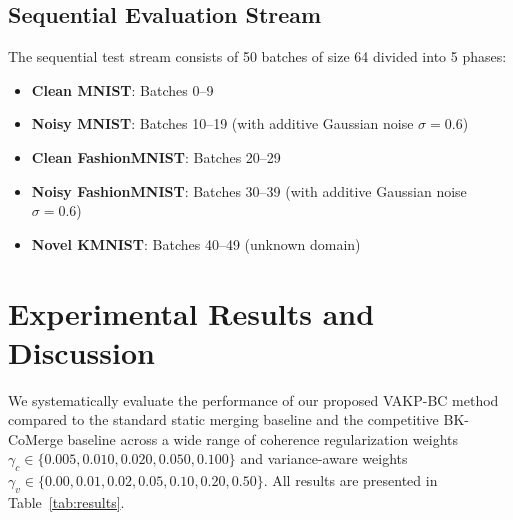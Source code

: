 \documentclass{article}
\theoremstyle{plain}
\theoremstyle{definition}
\theoremstyle{remark}
\begin{document}
\subsection{Sequential Evaluation Stream}
The sequential test stream consists of 50 batches of size 64 divided into 5 phases:
\begin{itemize}
    \item \textbf{Clean MNIST}: Batches 0--9
    \item \textbf{Noisy MNIST}: Batches 10--19 (with additive Gaussian noise $\sigma = 0.6$)
    \item \textbf{Clean FashionMNIST}: Batches 20--29
    \item \textbf{Noisy FashionMNIST}: Batches 30--39 (with additive Gaussian noise $\sigma = 0.6$)
    \item \textbf{Novel KMNIST}: Batches 40--49 (unknown domain)
\end{itemize}

\section{Experimental Results and Discussion}
\label{sec:results}

We systematically evaluate the performance of our proposed VAKP-BC method compared to the standard static merging baseline and the competitive BK-CoMerge baseline across a wide range of coherence regularization weights $\gamma_c \in \{0.005, 0.010, 0.020, 0.050, 0.100\}$ and variance-aware weights $\gamma_v \in \{0.00, 0.01, 0.02, 0.05, 0.10, 0.20, 0.50\}$. All results are presented in Table~\ref{tab:results}.
\end{document}
